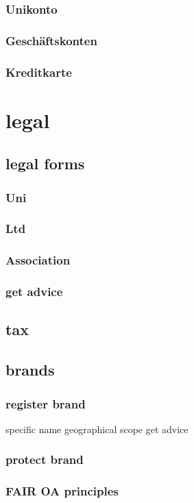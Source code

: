 \documentclass[output=guidelines,guidelines] {langscibook}
\begin{document}
\subsubsection{Unikonto}
\subsubsection{Geschäftskonten}
\subsubsection{Kreditkarte}
\section{legal}
\subsection{legal forms}
\subsubsection{Uni}
\subsubsection{Ltd}
\subsubsection{Association}
\subsubsection{get advice}
\subsection{tax}
\subsection{brands}
\subsubsection{register brand}
                    specific name
                    geographical scope
                    get advice
\subsubsection{protect brand}
\subsubsection{FAIR OA principles}
\end{document}
